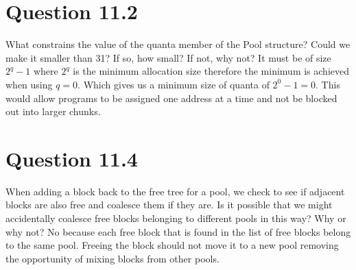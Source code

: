 \documentclass{article}
\begin{document}
\section*{Question 11.2}
What constrains the value of the quanta member of the Pool structure? Could we make it smaller than 31?
If so, how small?
If not, why not?
\newline
\newline
It must be of size $2^q-1$ where $2^q$ is the minimum allocation size therefore the minimum is achieved when using $q=0$.
Which gives us a minimum size of quanta of $2^0-1=0$. This would allow programs to be assigned one address at a time and not be blocked out into larger chunks. 

\section*{Question 11.4}
When adding a block back to the free tree for a pool, we check to see if adjacent blocks are also free and coalesce them if they are.
Is it possible that we might accidentally coalesce free blocks belonging to different pools in this way?
Why or why not?
\newline
\newline
No because each free block that is found in the list of free blocks belong to the same pool. Freeing the block should not move it to a new pool removing the opportunity of mixing blocks from other pools.
\end{document}
